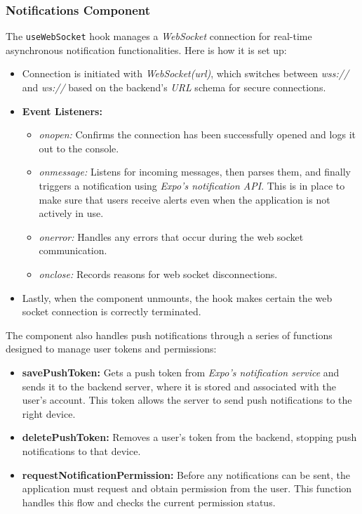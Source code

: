 \subsubsection{Notifications Component}

The \texttt{useWebSocket} hook manages a \textit{WebSocket} connection for real-time asynchronous notification functionalities. Here is how it is set up:

\begin{itemize}
    \item Connection is initiated with \textit{WebSocket(url)}, which switches between \textit{wss://} and \textit{ws://} based on the backend's \textit{URL} schema for secure connections.
    \item \textbf{Event Listeners:}
        \begin{itemize}
            \item \textit{onopen:} Confirms the connection has been successfully opened and logs it out to the console.
            \item \textit{onmessage:} Listens for incoming messages, then parses them, and finally triggers a notification using \textit{Expo's notification API}. This is in place to make sure that users receive alerts even when the application is not actively in use.
            \item \textit{onerror:} Handles any errors that occur during the web socket communication.
            \item \textit{onclose:} Records reasons for web socket disconnections.
        \end{itemize}
    \item Lastly, when the component unmounts, the hook makes certain the web socket connection is correctly terminated.
\end{itemize}

The component also handles push notifications through a series of functions designed to manage user tokens and permissions:

\begin{itemize}
    \item \textbf{savePushToken:} Gets a push token from \textit{Expo's notification service} and sends it to the backend server, where it is stored and associated with the user's account. This token allows the server to send push notifications to the right device.
    \item \textbf{deletePushToken:} Removes a user's token from the backend, stopping push notifications to that device.
    \item \textbf{requestNotificationPermission:} Before any notifications can be sent, the application must request and obtain permission from the user. This function handles this flow and checks the current permission status.
\end{itemize}

